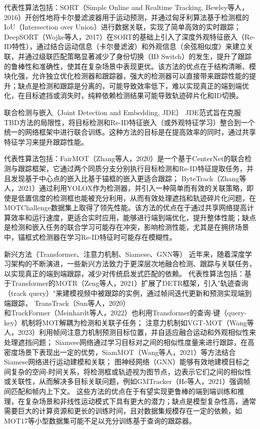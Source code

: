 代表性算法包括：SORT（Simple Online and Realtime Tracking, Bewley等人，2016）开创性地将卡尔曼滤波器用于运动预测，并通过匈牙利算法基于检测框的IoU（Intersection over Union）进行数据关联，实现了简单高效的实时跟踪\cite{169}；
DeepSORT（Wojke等人，2017）在SORT的基础上引入了深度外观特征嵌入（Re-ID特性），通过结合运动信息（卡尔曼滤波）和外观信息（余弦相似度）来建立关联，并通过级联匹配策略显著减少了身份切换（ID Switch）的发生，提升了跟踪的鲁棒性和准确性，使其在复杂场景中表现更优\cite{211}。该方法的优点在于结构清晰、模块化强，允许独立优化检测器和跟踪器，强大的检测器可以直接带来跟踪性能的提升；缺点是检测和跟踪是分离的，可能导致效率低下，难以实现真正的端到端优化，在目标遮挡或消失时，纯粹依赖检测结果可能导致轨迹碎片化和ID切换\cite{175}。

联合检测与嵌入（Joint Detection and Embedding, JDE）
JDE范式旨在克服TBD方法的局限性，将目标检测和Re-ID特征嵌入（或外观特征学习）整合到一个统一的网络框架中进行联合训练。这种方法的目标是在提高效率的同时，通过共享特征学习来提升跟踪性能\cite{173}\cite{90}。

代表性算法包括：FairMOT（Zhang等人，2020）是一个基于CenterNet的联合检测与跟踪框架，它通过两个同质分支分别执行目标检测和Re-ID特征提取任务，并且发现基于中心点的嵌入比基于锚框的嵌入更适合跟踪\cite{208}；
ByteTrack（Zhang等人，2021）通过利用YOLOX作为检测器，并引入一种简单而有效的关联策略，即使是低置信度的检测框也能被充分利用，从而有效处理遮挡和轨迹碎片化问题，在MOTChallenge数据集上取得了领先性能\cite{110}。该方法的优点在于通过共享网络提高计算效率和运行速度，更适合实时应用，能够进行端到端优化，提升整体性能；缺点是检测和嵌入任务的联合学习可能存在冲突，影响检测性能，尤其是在拥挤场景中，锚框式检测器在学习Re-ID特征时可能存在模糊性\cite{173}。

新兴方法（Transformer、注意力机制、Siamese、GNN等）
近年来，随着深度学习架构的不断演进，一些新兴方法致力于更深层次地融合检测、跟踪与关联任务，以实现真正的端到端跟踪，减少对传统启发式匹配的依赖\cite{108}。
代表性算法包括：基于Transformer的MOTR（Zeng等人，2021）扩展了DETR框架，引入"轨迹查询（track query）"来建模视频中被跟踪的实例，通过帧间迭代更新和预测实现端到端跟踪\cite{131}，
TransTrack（Sun等人，2020）\cite{97}和TrackFormer（Meinhardt等人，2022）\cite{164}也利用Transformer的查询-键（query-key）机制将MOT解耦为检测和关联子任务；
注意力机制如VGT-MOT（Wang等人，2023）\cite{85}利用帧间注意力机制预测目标位置，并自适应融合运动和外观相似性来处理遮挡问题；
Siamese网络通过学习目标对之间的相似性度量来进行跟踪，在高密度场景下表现出一定的优势，SiamMOT（Wang等人，2021）\cite{151}等方法结合Siamese网络进行运动建模和关联；
图神经网络（GNN）能够有效地建模目标之间复杂的空间-时间关系，将检测框或轨迹视为图节点，边表示它们之间的相似性或关联性，从而解决多目标关联问题，例如GMTracker（He等人，2021）强调帧间匹配和帧内上下文\cite{209}。
这些方法的优点在于有望实现更鲁棒的端到端训练和推理，在复杂场景和非线性运动模式下具有更大的潜力；缺点是模型复杂性高，通常需要巨大的计算资源和更长的训练时间，且对数据集规模存在一定的依赖，如MOT17等小型数据集可能不足以充分训练基于查询的跟踪器\cite{155}。


